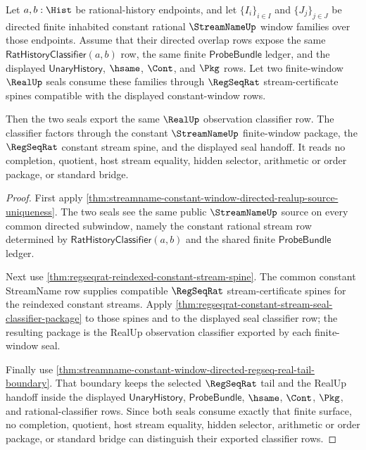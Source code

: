 \begin{theorem}
\label{thm:streamname-constant-directed-realup-seal-classifier-determinacy}
Let $a,b:\Hist$ be rational-history endpoints, and let
$\{I_i\}_{i\in I}$ and $\{J_j\}_{j\in J}$ be directed finite inhabited
constant rational $\StreamNameUp$ window families over those endpoints.
Assume that their directed overlap rows expose the same
$\mathsf{RatHistoryClassifier}(a,b)$ row, the same finite
$\mathsf{ProbeBundle}$ ledger, and the displayed $\mathsf{UnaryHistory}$,
$\hsame$, $\Cont$, and $\Pkg$ rows. Let two finite-window $\RealUp$ seals
consume these families through $\RegSeqRat$ stream-certificate spines
compatible with the displayed constant-window rows.

Then the two seals export the same $\RealUp$ observation classifier row. The
classifier factors through the constant $\StreamNameUp$ finite-window package,
the $\RegSeqRat$ constant stream spine, and the displayed seal handoff. It
reads no completion, quotient, host stream equality, hidden selector,
arithmetic or order package, or standard bridge.
\end{theorem}
\begin{proof}
First apply
\autoref{thm:streamname-constant-window-directed-realup-source-uniqueness}.
The two seals see the same public $\StreamNameUp$ source on every common
directed subwindow, namely the constant rational stream row determined by
$\mathsf{RatHistoryClassifier}(a,b)$ and the shared finite
$\mathsf{ProbeBundle}$ ledger.

Next use \autoref{thm:regseqrat-reindexed-constant-stream-spine}. The common
constant StreamName row supplies compatible $\RegSeqRat$ stream-certificate
spines for the reindexed constant streams. Apply
\autoref{thm:regseqrat-constant-stream-seal-classifier-package} to those
spines and to the displayed seal classifier row; the resulting package is the
RealUp observation classifier exported by each finite-window seal.

Finally use
\autoref{thm:streamname-constant-window-directed-regseq-real-tail-boundary}.
That boundary keeps the selected $\RegSeqRat$ tail and the RealUp handoff
inside the displayed $\mathsf{UnaryHistory}$, $\mathsf{ProbeBundle}$,
$\hsame$, $\Cont$, $\Pkg$, and rational-classifier rows. Since both seals
consume exactly that finite surface, no completion, quotient, host stream
equality, hidden selector, arithmetic or order package, or standard bridge can
distinguish their exported classifier rows.
\end{proof}

